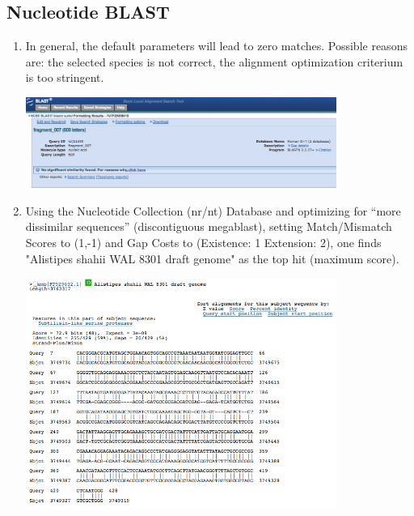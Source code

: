 \documentclass[a4paper,11pt]{article}
\begin{document}
\subsection{Nucleotide BLAST}

\begin{enumerate}
\item In general, the default parameters will lead to zero matches. Possible reasons are: the selected species is not correct, the alignment optimization criterium is too stringent.

\vspace{0.5cm}
\begin{center}
\includegraphics[width=0.8\textwidth]{blastn1.png}
\end{center}
\vspace{0.5cm}

\item Using the Nucleotide Collection (nr/nt) Database and optimizing for ``more dissimilar sequences''
(discontiguous megablast), setting Match/Mismatch Scores to (1,-1) and Gap Costs to (Existence: 1 Extension: 2), one finds "Alistipes shahii WAL 8301 draft genome" as the top hit (maximum score).

\vspace{0.5cm}
\begin{center}
\includegraphics[width=0.8\textwidth]{blastn2.png}
\end{center}
\vspace{0.5cm}


\end{enumerate}
\end{document}
